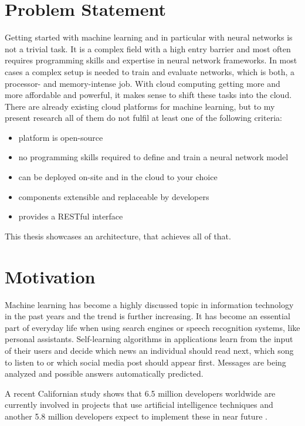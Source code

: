 \section{Problem Statement}\label{problem-statement}

Getting started with machine learning and in particular with neural
networks is not a trivial task. It is a complex field with a high entry
barrier and most often requires programming skills and expertise in
neural network frameworks. In most cases a complex setup is needed to
train and evaluate networks, which is both, a processor- and
memory-intense job. With cloud computing getting more and more
affordable and powerful, it makes sense to shift these tasks into the
cloud. There are already existing cloud platforms for machine learning,
but to my present research all of them do not fulfil at least one of the
following criteria:

\begin{itemize}
\tightlist
\item
  platform is open-source
\item
  no programming skills required to define and train a neural network
  model
\item
  can be deployed on-site and in the cloud to your choice
\item
  components extensible and replaceable by developers
\item
  provides a RESTful interface
\end{itemize}

This thesis showcases an architecture, that achieves all of that.

\section{Motivation}\label{motivation}

Machine learning has become a highly discussed topic in information
technology in the past years and the trend is further increasing. It has
become an essential part of everyday life when using search engines or
speech recognition systems, like personal assistants. Self-learning
algorithms in applications learn from the input of their users and
decide which news an individual should read next, which song to listen
to or which social media post should appear first. Messages are being
analyzed and possible answers automatically predicted.

A recent Californian study shows that 6.5 million developers worldwide
are currently involved in projects that use artificial intelligence
techniques and another 5.8 million developers expect to implement these
in near future \cite{evans}.

